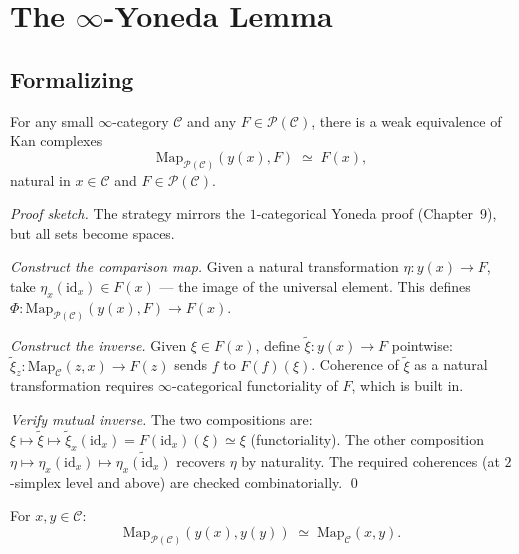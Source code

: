 \section{The $\infty$-Yoneda Lemma}
\label{sec:yoneda-lemma-statement}

\subsection{Formalizing}

\begin{theorem}
\label{thm:infty-yoneda}
For any small $\infty$-category $\mathcal{C}$ and any $F \in
\mathcal{P}(\mathcal{C})$, there is a weak equivalence of Kan complexes
\begin{equation*}
  \mathrm{Map}_{\mathcal{P}(\mathcal{C})}(y(x), F) \;\simeq\; F(x),
\end{equation*}
natural in $x \in \mathcal{C}$ and $F \in \mathcal{P}(\mathcal{C})$.
\end{theorem}

\begin{proof}[Proof sketch]
The strategy mirrors the $1$-categorical Yoneda proof (Chapter~9), but
all sets become spaces.

\emph{Construct the comparison map.} Given a natural transformation
$\eta : y(x) \to F$, take $\eta_x(\mathrm{id}_x) \in F(x)$ — the image of
the universal element. This defines $\Phi : \mathrm{Map}_{\mathcal{P}(\mathcal{C})}(y(x), F)
\to F(x)$.

\emph{Construct the inverse.} Given $\xi \in F(x)$, define
$\widetilde \xi : y(x) \to F$ pointwise: $\widetilde \xi_z : \mathrm{Map}_\mathcal{C}(z, x)
\to F(z)$ sends $f$ to $F(f)(\xi)$. Coherence of $\widetilde \xi$ as a
natural transformation requires $\infty$-categorical functoriality of $F$,
which is built in.

\emph{Verify mutual inverse.} The two compositions are: $\xi \mapsto
\widetilde \xi \mapsto \widetilde \xi_x(\mathrm{id}_x) = F(\mathrm{id}_x)(\xi)
\simeq \xi$ (functoriality). The other composition $\eta \mapsto \eta_x(\mathrm{id}_x)
\mapsto \widetilde{\eta_x(\mathrm{id}_x)}$ recovers $\eta$ by naturality.
The required coherences (at $2$-simplex level and above) are checked
combinatorially.
\qed
\end{proof}

\begin{corollary}
\label{cor:yoneda-representables}
For $x, y \in \mathcal{C}$:
\begin{equation*}
  \mathrm{Map}_{\mathcal{P}(\mathcal{C})}(y(x), y(y)) \;\simeq\; \mathrm{Map}_\mathcal{C}(x, y).
\end{equation*}
\end{corollary}

